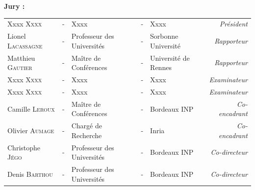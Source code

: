 \documentclass[a4paper, 11pt]{article}
\begin{document}
  \noindent \large \textbf{Jury :} \\
  \vspace*{-1.5em}
  \begin{center}
    \begin{tabular}{lclclr}
      Xxxx       \textsc{Xxxx}       & - & Xxxx                       & - & Xxxx                 & \textit{Président}    \\
      Lionel     \textsc{Lacassagne} & - & Professeur des Universités & - & Sorbonne Université  & \textit{Rapporteur}   \\
      Matthieu   \textsc{Gautier}    & - & Maître de Conférences      & - & Université de Rennes & \textit{Rapporteur}   \\
      Xxxx       \textsc{Xxxx}       & - & Xxxx                       & - & Xxxx                 & \textit{Examinateur}  \\
      Xxxx       \textsc{Xxxx}       & - & Xxxx                       & - & Xxxx                 & \textit{Examinateur}  \\
      Camille    \textsc{Leroux}     & - & Maître de Conférences      & - & Bordeaux INP         & \textit{Co-encadrant} \\
      Olivier    \textsc{Aumage}     & - & Chargé de Recherche        & - & Inria                & \textit{Co-encadrant} \\
      Christophe \textsc{Jégo}       & - & Professeur des Universités & - & Bordeaux INP         & \textit{Co-directeur} \\
      Denis      \textsc{Barthou}    & - & Professeur des Universités & - & Bordeaux INP         & \textit{Co-directeur} \\
    \end{tabular}
  \end{center}
\end{document}
